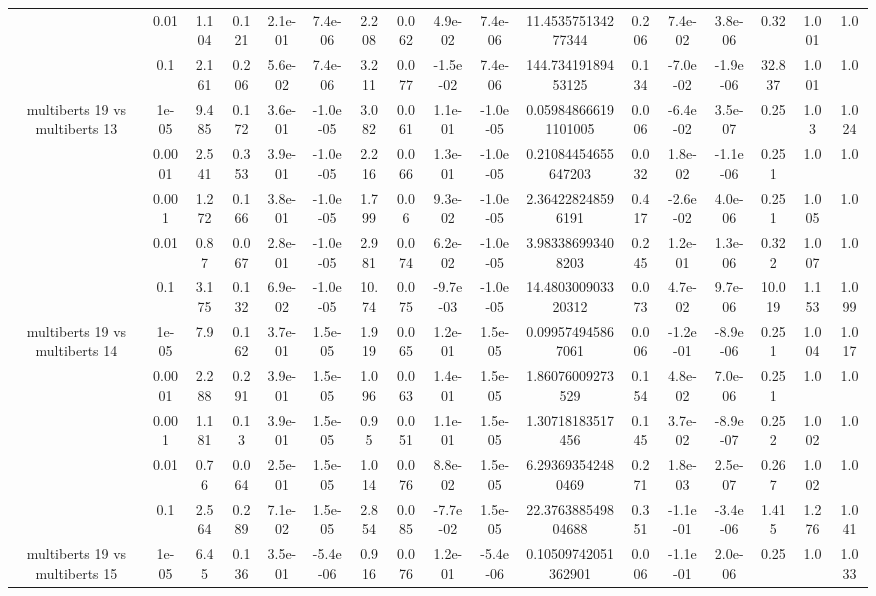 \begin{tabular}{|c|c|c|c|c|c|c|c|c|c|c|c|c|c|c|c|c|}
 & 0.01 & 1.104 & 0.121 & 2.1e-01 & 7.4e-06 & 2.208 & 0.062 & 4.9e-02 & 7.4e-06 & 11.453575134277344 & 0.206 & 7.4e-02 & 3.8e-06 & 0.32 & 1.001 & 1.0 \\
 & 0.1 & 2.161 & 0.206 & 5.6e-02 & 7.4e-06 & 3.211 & 0.077 & -1.5e-02 & 7.4e-06 & 144.73419189453125 & 0.134 & -7.0e-02 & -1.9e-06 & 32.837 & 1.001 & 1.0 \\
\hline
\multirow{5}{*}{multiberts 19 vs multiberts 13} & 1e-05 & 9.485 & 0.172 & 3.6e-01 & -1.0e-05 & 3.082 & 0.061 & 1.1e-01 & -1.0e-05 & 0.059848666191101005 & 0.006 & -6.4e-02 & 3.5e-07 & 0.25 & 1.03 & 1.024 \\
 & 0.0001 & 2.541 & 0.353 & 3.9e-01 & -1.0e-05 & 2.216 & 0.066 & 1.3e-01 & -1.0e-05 & 0.21084454655647203 & 0.032 & 1.8e-02 & -1.1e-06 & 0.251 & 1.0 & 1.0 \\
 & 0.001 & 1.272 & 0.166 & 3.8e-01 & -1.0e-05 & 1.799 & 0.06 & 9.3e-02 & -1.0e-05 & 2.364228248596191 & 0.417 & -2.6e-02 & 4.0e-06 & 0.251 & 1.005 & 1.0 \\
 & 0.01 & 0.87 & 0.067 & 2.8e-01 & -1.0e-05 & 2.981 & 0.074 & 6.2e-02 & -1.0e-05 & 3.983386993408203 & 0.245 & 1.2e-01 & 1.3e-06 & 0.322 & 1.007 & 1.0 \\
 & 0.1 & 3.175 & 0.132 & 6.9e-02 & -1.0e-05 & 10.74 & 0.075 & -9.7e-03 & -1.0e-05 & 14.480300903320312 & 0.073 & 4.7e-02 & 9.7e-06 & 10.019 & 1.153 & 1.099 \\
\hline
\multirow{5}{*}{multiberts 19 vs multiberts 14} & 1e-05 & 7.9 & 0.162 & 3.7e-01 & 1.5e-05 & 1.919 & 0.065 & 1.2e-01 & 1.5e-05 & 0.099574945867061 & 0.006 & -1.2e-01 & -8.9e-06 & 0.251 & 1.004 & 1.017 \\
 & 0.0001 & 2.288 & 0.291 & 3.9e-01 & 1.5e-05 & 1.096 & 0.063 & 1.4e-01 & 1.5e-05 & 1.86076009273529 & 0.154 & 4.8e-02 & 7.0e-06 & 0.251 & 1.0 & 1.0 \\
 & 0.001 & 1.181 & 0.13 & 3.9e-01 & 1.5e-05 & 0.95 & 0.051 & 1.1e-01 & 1.5e-05 & 1.30718183517456 & 0.145 & 3.7e-02 & -8.9e-07 & 0.252 & 1.002 & 1.0 \\
 & 0.01 & 0.76 & 0.064 & 2.5e-01 & 1.5e-05 & 1.014 & 0.076 & 8.8e-02 & 1.5e-05 & 6.293693542480469 & 0.271 & 1.8e-03 & 2.5e-07 & 0.267 & 1.002 & 1.0 \\
 & 0.1 & 2.564 & 0.289 & 7.1e-02 & 1.5e-05 & 2.854 & 0.085 & -7.7e-02 & 1.5e-05 & 22.376388549804688 & 0.351 & -1.1e-01 & -3.4e-06 & 1.415 & 1.276 & 1.041 \\
\hline
\multirow{5}{*}{multiberts 19 vs multiberts 15} & 1e-05 & 6.45 & 0.136 & 3.5e-01 & -5.4e-06 & 0.916 & 0.076 & 1.2e-01 & -5.4e-06 & 0.10509742051362901 & 0.006 & -1.1e-01 & 2.0e-06 & 0.25 & 1.0 & 1.033 \\

\end{tabular}
